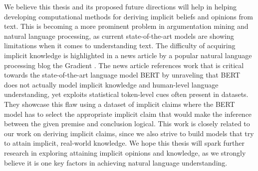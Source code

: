 We believe this thesis and its proposed future directions will help in helping
developing computational methods for deriving implicit beliefs and opinions
from text.  This is becoming a more prominent problem in argumentation mining
and natural language processing, as current state-of-the-art models are showing
limitations when it comes to understanding text. 
The difficulty of acquiring implicit knowledge is highlighted
in a news article by a popular natural language processing blog the Gradient
\citep{gradientpub}.  The news article references work that is 
critical towards the state-of-the-art language
model BERT \citep{devlin2018bert} by unraveling that BERT
does not actually model implicit knowledge and human-level language
understanding, yet exploits statistical token-level cues often present in
datasets. They showcase this flaw using a dataset of implicit claims where the
BERT model has to select the appropriate implicit claim that would make the
inference between the given premise and conclusion logical. This work
is closely related to our work on deriving implicit claims, since we also strive to 
build models that try to attain implicit, real-world knowledge. 
We hope this thesis will spark further research in exploring
attaining implicit opinions and knowledge, as we strongly believe it 
is one key factors in achieving natural language understanding. 



